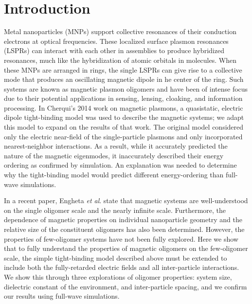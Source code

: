 \documentclass[journal=ancac3,manuscript=article]{achemso}
\begin{document}
\section{Introduction}
Metal nanoparticles (MNPs) support collective resonances of their conduction electrons at optical frequencies. These localized surface plasmon resonances (LSPRs) can interact with each other in assemblies to produce hybridized resonances, much like the hybridization of atomic orbitals in molecules\cite{Lucas1976,ARAVIND1981,Xu1995,Mischenko1995}. When these MNPs are arranged in rings, the single LSPRs can give rise to a collective mode that produces an oscillating magnetic dipole in he center of the ring\cite{Alu2006,Alu2008,Liu2011,Nord2006,Cherqui2014,Cherqui2016}. Such systems are known as magnetic plasmon oligomers and have been of intense focus due to their potential applications in sensing\cite{Zia2010trans,Noginova2008trans,Wang:13,Fan2015,Wei2015,Shvets2012,Altug2012bio,Nord2011fano}, lensing, cloaking, and information processing\cite{Zhang2006,NordHal2011,NordHal2012}. In Cherqui's 2014 work on magnetic plasmons, a quasistatic, electric dipole tight-binding model was used to describe the magnetic systems\cite{Cherqui2014}; we adapt this model to expand on the results of that work. The original model considered only the electric near-field of the single-particle plasmons and only incorporated nearest-neighbor interactions. As a result, while it accurately predicted the nature of the magnetic eigenmodes, it inaccurately described their energy ordering as confirmed by simulation. An explanation was needed to determine why the tight-binding model would predict different energy-ordering than full-wave simulations.

In a recent paper, Engheta \textit{et al}. state that magnetic systems are well-understood on the single oligomer scale and the nearly infinite scale\cite{Engheta2017}. Furthermore, the dependence of magnetic properties on individual nanoparticle geometry and the relative size of the constituent oligomers has also been determined\cite{Cherqui2016}. However, the properties of few-oligomer systems have not been fully explored. Here we show that to fully understand the properties of magnetic oligomers on the few-oligomer scale, the simple tight-binding model described above must be extended to include both the fully-retarded electric fields and all inter-particle interactions. We show this through three explorations of oligomer properties: system size, dielectric constant of the environment, and inter-particle spacing, and we confirm our results using full-wave simulations\cite{Hohenester2012}.
\end{document}
